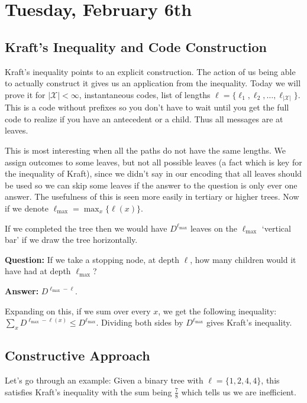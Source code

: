 \section{Tuesday, February 6th}
\subsection{Kraft's Inequality and Code Construction}
Kraft’s inequality points to an explicit construction. The action of us being able to actually construct it gives us an application from the inequality. Today we will prove it for \( |\mathcal{X}| < \infty \), instantaneous codes, list of lengths \( \ell=\{\ell_1, \ell_2, \ldots, \ell_{|\mathcal{X}|}\} \). 
This is a code without prefixes so you don’t have to wait until you get the full code to realize if you have an antecedent or a child. Thus all messages are at leaves.

This is most interesting when all the paths do not have the same lengths. We assign outcomes to some leaves, but not all possible leaves (a fact which is key for the inequality of Kraft), since we didn’t say in our encoding that all leaves should be used so we can skip some leaves if the answer to the question is only ever one answer. The usefulness of this is seen more easily in tertiary or higher trees. Now if we denote \( \ell_{\max} = \max_x\{\ell(x)\} \).

If we completed the tree then we would have \( D^{\ell_{\max}} \) leaves on the \( \ell_{\max} \) ‘vertical bar’ if we draw the tree horizontally. 

\begin{shaded}
\textbf{Question:} If we take a stopping node, at depth \( \ell \), how many children would it have had at depth \( \ell_{\max} \)?
\end{shaded}

\textbf{Answer:} \( D^{\ell_{\max} - \ell} \).

Expanding on this, if we sum over every \( x \), we get the following inequality: \( \sum_x D^{\ell_{\max} - \ell(x)} \leq D^{\ell_{\max}} \). Dividing both sides by \( D^{\ell_{\max}} \) gives Kraft’s inequality.

\subsection{Constructive Approach}

Let’s go through an example:
Given a binary tree with \( \ell = \{1,2,4,4\} \), this satisfies Kraft’s inequality with the sum being \( \frac{7}{8} \) which tells us we are inefficient.

